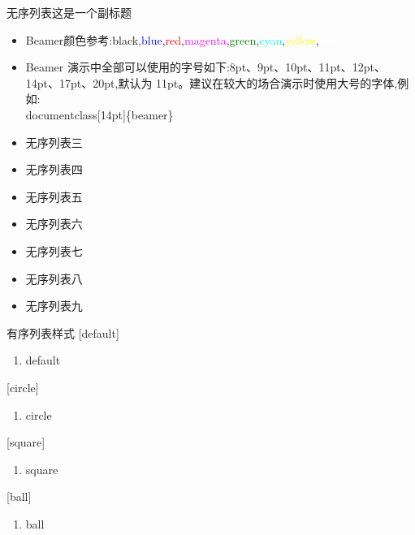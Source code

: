 \begin{frame}{无序列表}{这是一个副标题}
    \begin{itemize}
         \item Beamer颜色参考:\textcolor{black}black,\textcolor{blue}{blue},\textcolor{red}{red},\textcolor{magenta}{magenta},\textcolor{green}{green},\textcolor{cyan}{cyan},\textcolor{yellow}{yellow},\textcolor{white}{white}
         \item Beamer 演示中全部可以使用的字号如下:8pt、9pt、10pt、11pt、12pt、14pt、17pt、20pt,默认为 11pt。建议在较大的场合演示时使用大号的字体,例如:\\documentclass[14pt]\{beamer\}
         \item 无序列表三
         \item 无序列表四
         \item 无序列表五
         \item 无序列表六
         \item 无序列表七
         \item 无序列表八
         \item 无序列表九
    \end{itemize}
\end{frame}

\begin{frame}{有序列表样式}
[default]
    \begin{enumerate}[<+-|alert@+>]
        \item default
    \end{enumerate}

[circle]

    \begin{enumerate}[<+-|alert@+>]
        \item circle
    \end{enumerate}

[square]

    \begin{enumerate}[<+-|alert@+>]
        \item square
    \end{enumerate}

[ball]

    \begin{enumerate}[<+-|alert@+>]
        \item ball
    \end{enumerate}
\end{frame}

